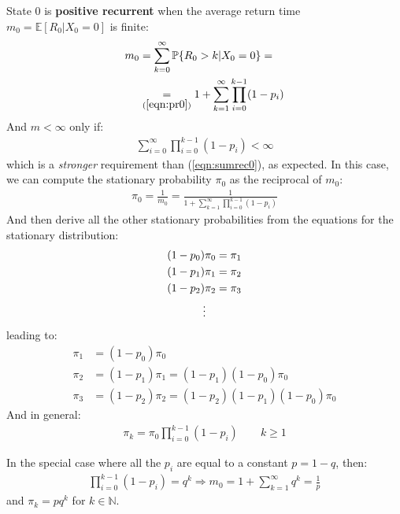 \documentclass[../template.tex]{subfiles}
\begin{document}
\begin{example}
State $0$ is \textbf{positive recurrent} when the average return time $m_0 = \mathbb{E}[R_0 | X_0 = 0]$ is finite:
\begin{align*}
    m_0 &= \sum_{k=0}^\infty \mathbb{P}\{R_0 > k | X_0 = 0\} = \\
    &\underset{(\ref{eqn:pr0})}{=}  1+ \sum_{k=1}^\infty \prod_{i=0}^{k-1} (1-p_i)
\end{align*}
And $m < \infty$ only if:
\begin{align*}
    \sum_{i=0}^\infty \prod_{i=0}^{k-1} (1-p_i) < \infty
\end{align*}
which is a \textit{stronger} requirement than (\ref{eqn:sumrec0}), as expected. In this case, we can compute the stationary probability $\pi_0$ as the reciprocal of $m_0$:
\begin{align*}
    \pi_0 = \frac{1}{m_0} = \frac{1}{\displaystyle 1+ \sum_{k=1}^\infty \prod_{i=0}^{k-1} (1-p_i)}  
\end{align*}
And then derive all the other stationary probabilities from the equations for the stationary distribution:
\begin{align*}
    (1-p_0) \pi_0 &= \pi_1\\
    (1-p_1) \pi_1 &= \pi_2\\
    (1-p_2) \pi_2 &= \pi_3\\
    \vdots \span
\end{align*}
leading to:
\begin{align*}
    \pi_1 &= (1-p_0) \pi_0\\
    \pi_2 &= (1-p_1)\pi_1 = (1-p_1) (1-p_0) \pi_0\\
    \pi_3 &= (1-p_2) \pi_2 = (1-p_2)(1-p_1) (1-p_0) \pi_0
\end{align*}
And in general:
\begin{align*}
    \pi_k = \pi_0 \prod_{i=0}^{k-1} (1-p_i) \qquad k \geq 1
\end{align*}

In the special case where all the $p_i$ are equal to a constant $p = 1-q$, then:
\begin{align*}
    \prod_{i=0}^{k-1} (1-p_i) = q^k \Rightarrow m_0 = 1 + \sum_{k=1}^\infty q^k = \frac{1}{p} 
\end{align*}
and $\pi_k = p q^k$ for $k \in \mathbb{N}$.
\end{example}
\end{document}

